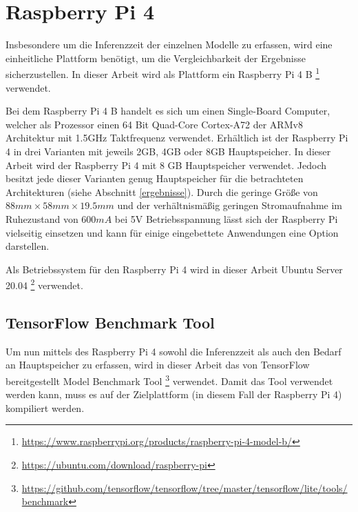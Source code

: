 \section{Raspberry Pi 4}
\label{raspberry_pi_4}
Insbesondere um die Inferenzzeit der einzelnen Modelle zu erfassen, wird eine einheitliche Plattform benötigt, um die Vergleichbarkeit der Ergebnisse sicherzustellen. In dieser Arbeit wird als Plattform ein Raspberry Pi 4 B \footnote{\url{https://www.raspberrypi.org/products/raspberry-pi-4-model-b/}} verwendet.

Bei dem Raspberry Pi 4 B handelt es sich um einen Single-Board Computer, welcher als Prozessor einen 64 Bit Quad-Core Cortex-A72 der ARMv8 Architektur mit 1.5GHz Taktfrequenz verwendet. Erhältlich ist der Raspberry Pi 4 in drei Varianten mit jeweils 2GB, 4GB oder 8GB Hauptspeicher. In dieser Arbeit wird der Raspberry Pi 4 mit 8 GB Hauptspeicher verwendet. Jedoch besitzt jede dieser Varianten genug Hauptspeicher für die betrachteten Architekturen (siehe Abschnitt \ref{ergebnisse}). Durch die geringe Größe von $88mm \times 58mm \times 19.5mm$ und der verhältnismäßig geringen Stromaufnahme im Ruhezustand von $600mA$ bei 5V Betriebsspannung lässt sich der Raspberry Pi vielseitig einsetzen und kann für einige eingebettete Anwendungen eine Option darstellen.

Als Betriebssystem für den Raspberry Pi 4 wird in dieser Arbeit Ubuntu Server 20.04 \footnote{\url{https://ubuntu.com/download/raspberry-pi}} verwendet.


\subsection{TensorFlow Benchmark Tool}
\label{tensorflow_benchmark_tool}
Um nun mittels des Raspberry Pi 4 sowohl die Inferenzzeit als auch den Bedarf an Hauptspeicher zu erfassen, wird in dieser Arbeit das von TensorFlow bereitgestellt Model Benchmark Tool \footnote{\url{https://github.com/tensorflow/tensorflow/tree/master/tensorflow/lite/tools/benchmark}} verwendet. Damit das Tool verwendet werden kann, muss es auf der Zielplattform (in diesem Fall der Raspberry Pi 4) kompiliert werden.

